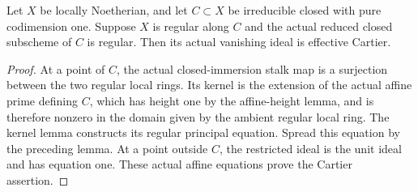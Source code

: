 \endgroup

\begingroup

\begin{theorem}
\label{thm:snc-regular-component-cartier}
\leanok
Let $X$ be locally Noetherian, and let $C\subset X$ be irreducible
closed with pure codimension one. Suppose $X$ is regular along $C$
and the actual reduced closed subscheme of $C$ is regular.
Then its actual vanishing ideal is effective Cartier.
\end{theorem}
\begin{proof}
At a point of $C$, the actual closed-immersion stalk map is a
surjection between the two regular local rings. Its kernel is
the extension of the actual affine prime defining $C$, which
has height one by the affine-height lemma, and is therefore
nonzero in the domain given by the ambient regular local ring.
The kernel lemma constructs its regular principal equation.
Spread this equation by the preceding lemma. At a point outside
$C$, the restricted ideal is the unit ideal and has equation one.
These actual affine equations prove the Cartier assertion.
\leanok
\end{proof}

\endgroup

\begingroup


